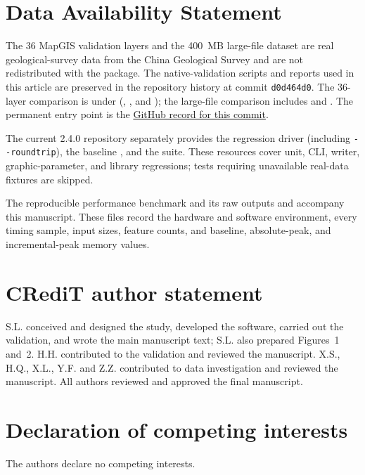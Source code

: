 \documentclass[11pt,a4paper]{article}
\begin{document}
\section*{Data Availability Statement}
The 36 MapGIS validation layers and the 400~MB large-file dataset are real geological-survey data from the China Geological Survey and are not redistributed with the package. The native-validation scripts and reports used in this article are preserved in the repository history at commit \texttt{d0d464d0}. The 36-layer comparison is under  (, , and ); the large-file comparison includes  and . The permanent entry point is the \href{https://github.com/leecugb/mapgis2shp/tree/d0d464d05166ab97978a01ce8cc5cc8480f05500}{GitHub record for this commit}.

The current 2.4.0 repository separately provides the regression driver  (including \texttt{-{}-roundtrip}), the baseline , and the  suite. These resources cover unit, CLI, writer, graphic-parameter, and library regressions; tests requiring unavailable real-data fixtures are skipped.

The reproducible performance benchmark  and its raw outputs  and  accompany this manuscript. These files record the hardware and software environment, every timing sample, input sizes, feature counts, and baseline, absolute-peak, and incremental-peak memory values.

\section*{CRediT author statement}
S.L. conceived and designed the study, developed the software, carried out the validation, and wrote the main manuscript text; S.L. also prepared Figures~1 and~2. H.H. contributed to the validation and reviewed the manuscript. X.S., H.Q., X.L., Y.F. and Z.Z. contributed to data investigation and reviewed the manuscript. All authors reviewed and approved the final manuscript.

\section*{Declaration of competing interests}
The authors declare no competing interests.
\end{document}
